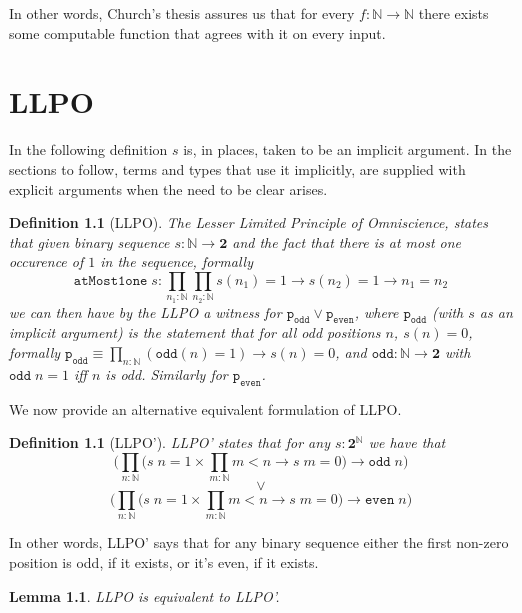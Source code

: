 \documentclass[12pt]{report}
\newtheorem{lem}[thm]{Lemma}
\newtheorem{defn}[thm]{Definition}
\theoremstyle{definition}
\begin{document}
In other words, Church's thesis assures us that for every $f : \mathbb{N} \rightarrow \mathbb{N}$ there exists some computable function that agrees with it on every input.


\chapter{LLPO}
In the following definition $s$ is, in places, taken to be an implicit argument. 
In the sections to follow, terms and types that use it implicitly, are supplied with explicit arguments when the need to be clear arises. 
\begin{defn}[LLPO]\label{LLPO}
The Lesser Limited Principle of Omniscience, states that given binary sequence $s : \mathbb{N} \rightarrow \mathbf{2}$ and the fact that there is at most one occurence of $1$ in the sequence, formally 
$$\mathtt{atMost1one}\; s :\prod_{n_1 : \mathbb{N}} \prod_{n_2 : \mathbb{N}} s(n_1) = 1 \rightarrow s(n_2)= 1 \rightarrow n_1 = n_2$$
we can then have by the LLPO a witness for $\mathtt{p_{odd}} \vee \mathtt{p_{even}}$, where $\mathtt{p_{odd}}$ (with $s$ as an implicit argument) is the statement that for all odd positions $n$, $s(n) = 0$, formally $\mathtt{p_{odd}} \equiv \prod_{n : \mathbb{N}} (\mathtt{odd}(n) = 1) \rightarrow s(n) = 0$, and $\mathtt{odd} : \mathbb{N}\rightarrow \mathbf{2}$ with $\mathtt{odd}\; n = 1$ iff $n$ is odd. 
Similarly for $\mathtt{p_{even}}$. 
\end{defn}
We now provide an alternative equivalent formulation of LLPO. 
\begin{defn}[LLPO']
LLPO' states that for any $s: \mathbf{2}^\mathbb{N}$ we have that
$$ \Big( \prod_{n : \mathbb{N}} \big( s\;n = 1 \times \prod_{m : \mathbb{N}} m < n \rightarrow s\;m=0 \big) \rightarrow \mathtt{odd}\;n \Big)$$
\center$$\vee$$
$$ \Big( \prod_{n : \mathbb{N}} \big( s\;n = 1 \times \prod_{m : \mathbb{N}} m < n \rightarrow s\;m=0 \big) \rightarrow \mathtt{even}\;n \Big)$$
\end{defn}
In other words, LLPO' says that for any binary sequence either the first non-zero position is odd, if it exists, or it's even, if it exists. 
\begin{lem}
LLPO is equivalent to LLPO'.
\end{lem}
\end{document}

